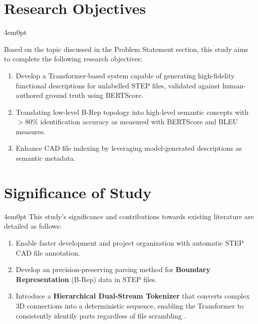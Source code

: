 \section{Research Objectives}
\begin{indentedblock}{4em}{0pt}
	
	Based on the topic discussed in the Problem Statement section, this study aims to complete the following research objectives:
	
	\begin{enumerate}
		\item {
			Develop a Transformer-based system capable of generating high-fidelity functional descriptions for unlabelled STEP files, validated against human-authored ground truth using BERTScore.
		}
		\item {
			Translating low-level B-Rep topology into high-level semantic concepts with $>80\%$ identification accuracy as measured with BERTScore and BLEU measures.
		}
		\item {
			Enhance CAD file indexing by leveraging model-generated descriptions as semantic metadata.
		}
	\end{enumerate}
	
	
\end{indentedblock}

\section{Significance of Study}
	\begin{indentedblock}{4em}{0pt}
		This study's significance and contributions towards existing literature are detailed as follows:
	
		\begin{enumerate}
			\item { 
				Enable faster development and project organization with automatic STEP CAD file annotation.
			}
			\item {
				Develop an precision-preserving parsing method for \textbf{Boundary Representation} (B-Rep) data in STEP files.
			}
			\item {
				Introduce a \textbf{Hierarchical Dual-Stream Tokenizer} that converts complex 3D connections into a deterministic sequence, enabling the Transformer to consistently identify parts regardless of file scrambling \parencite{deepcad_wu}.
			}
		\end{enumerate}
		
	\end{indentedblock}


